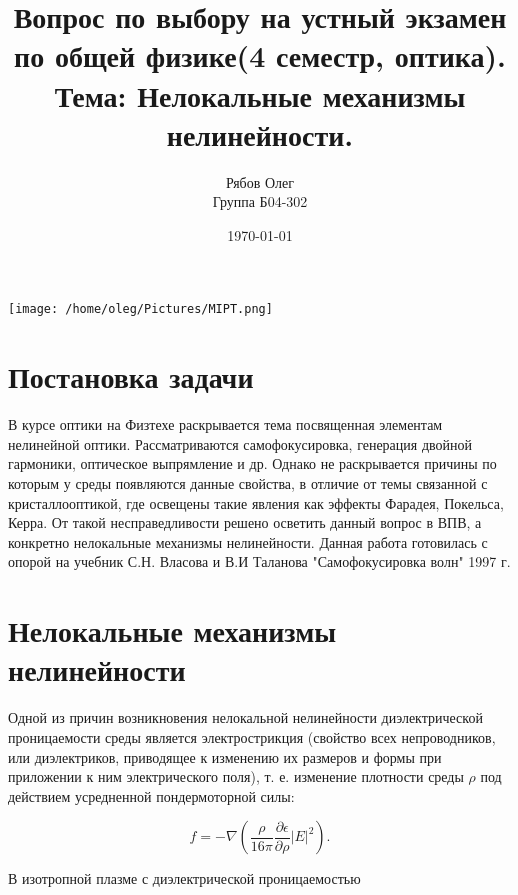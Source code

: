 \documentclass[a4paper, 12pt]{article}
\begin{document}
\begin{titlepage}
    \title{Вопрос по выбору на устный экзамен\\
    по общей физике(4 семестр, оптика).\\
    Тема: Нелокальные механизмы нелинейности.
    }
    \author{Рябов Олег \\
    Группа Б04-302}
    \date{\today}
    \maketitle
    \vfill
    \begin{center}
        \texttt{[image: /home/oleg/Pictures/MIPT.png]}
    \end{center}
\end{titlepage}

\setcounter{page}{2}
\section*{Постановка задачи}

В курсе оптики на Физтехе раскрывается тема посвященная элементам нелинейной оптики. Рассматриваются самофокусировка, генерация двойной гармоники, оптическое выпрямление и др. Однако не раскрывается причины по которым у среды появляются данные свойства, в отличие от темы связанной с кристаллооптикой, где освещены такие явления как эффекты Фарадея, Покельса, Керра. От такой несправедливости решено осветить данный вопрос в ВПВ, а конкретно нелокальные механизмы нелинейности. Данная работа готовилась с опорой на учебник С.Н. Власова и В.И Таланова "Самофокусировка волн"  1997 г. 
\section*{Нелокальные механизмы нелинейности}

Одной из причин возникновения нелокальной нелинейности диэлектрической проницаемости среды является электрострикция (свойство всех непроводников, или диэлектриков, приводящее к изменению их размеров и формы при приложении к ним электрического поля), т. е. изменение плотности среды \(\rho\) под действием усредненной пондермоторной силы:

\begin{equation}
f = -\nabla \left(\frac{\rho}{16\pi} \frac{\partial \epsilon}{\partial \rho} |E|^2 \right).
\label{eq:1.30}
\end{equation}

В изотропной плазме с диэлектрической проницаемостью
\end{document}
